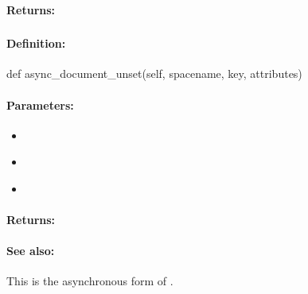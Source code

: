 \paragraph{Returns:}


\pagebreak
\subsubsection{}
\label{api:python:async_document_unset}


\paragraph{Definition:}
\begin{pythoncode}
def async_document_unset(self, spacename, key, attributes)
\end{pythoncode}

\paragraph{Parameters:}
\begin{itemize}[noitemsep]
\item {}\\

\item {}\\

\item {}\\

\end{itemize}

\paragraph{Returns:}


\paragraph{See also:}  This is the asynchronous form of .

\pagebreak
\subsubsection{}
\label{api:python:uxact_document_unset}


